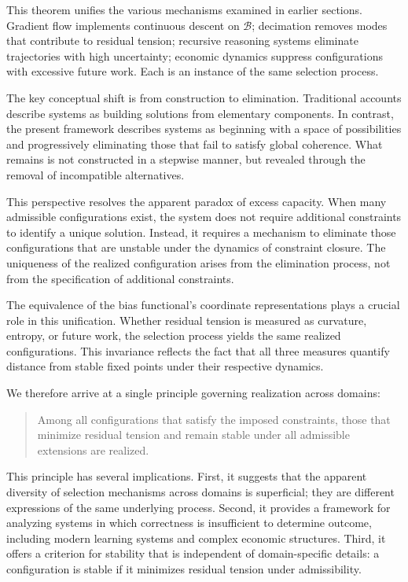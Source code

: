\documentclass[11pt]{article}
\theoremstyle{plain}
\theoremstyle{definition}
\theoremstyle{remark}
\begin{document}
This theorem unifies the various mechanisms examined in earlier sections. Gradient flow implements continuous descent on $\mathcal{B}$; decimation removes modes that contribute to residual tension; recursive reasoning systems eliminate trajectories with high uncertainty; economic dynamics suppress configurations with excessive future work. Each is an instance of the same selection process.

The key conceptual shift is from construction to elimination. Traditional accounts describe systems as building solutions from elementary components. In contrast, the present framework describes systems as beginning with a space of possibilities and progressively eliminating those that fail to satisfy global coherence. What remains is not constructed in a stepwise manner, but revealed through the removal of incompatible alternatives.

This perspective resolves the apparent paradox of excess capacity. When many admissible configurations exist, the system does not require additional constraints to identify a unique solution. Instead, it requires a mechanism to eliminate those configurations that are unstable under the dynamics of constraint closure. The uniqueness of the realized configuration arises from the elimination process, not from the specification of additional constraints.

The equivalence of the bias functional's coordinate representations plays a crucial role in this unification. Whether residual tension is measured as curvature, entropy, or future work, the selection process yields the same realized configurations. This invariance reflects the fact that all three measures quantify distance from stable fixed points under their respective dynamics.

We therefore arrive at a single principle governing realization across domains:

\begin{quote}
Among all configurations that satisfy the imposed constraints, those that minimize residual tension and remain stable under all admissible extensions are realized.
\end{quote}

This principle has several implications. First, it suggests that the apparent diversity of selection mechanisms across domains is superficial; they are different expressions of the same underlying process. Second, it provides a framework for analyzing systems in which correctness is insufficient to determine outcome, including modern learning systems and complex economic structures. Third, it offers a criterion for stability that is independent of domain-specific details: a configuration is stable if it minimizes residual tension under admissibility.
\end{document}
